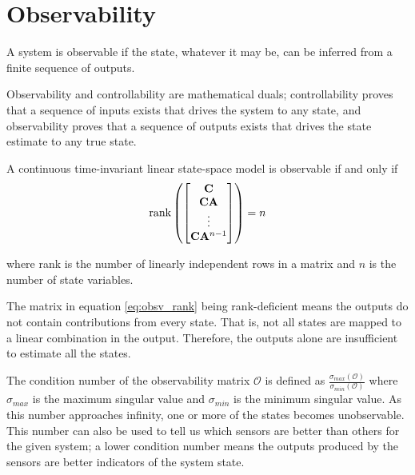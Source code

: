 \section{Observability}

A \gls{system} is observable if the \gls{state}, whatever it may be, can be
inferred from a finite sequence of \glspl{output}.

Observability and controllability are mathematical duals; controllability proves
that a sequence of \glspl{input} exists that drives the \gls{system} to any
\gls{state}, and observability proves that a sequence of \glspl{output} exists
that drives the \gls{state} estimate to any true \gls{state}.
\begin{theorem}[Observability]
  A continuous \gls{time-invariant} linear state-space \gls{model} is observable
  if and only if
  \begin{equation}
    \operatorname{rank}\left(
    \begin{bmatrix}
      \mathbf{C} \\
      \mathbf{C}\mathbf{A} \\
      \vdots \\
      \mathbf{C}\mathbf{A}^{n-1}
    \end{bmatrix}\right) = n \label{eq:obsv_rank}
  \end{equation}

  where rank is the number of linearly independent rows in a matrix and $n$ is
  the number of \gls{state} variables.
\end{theorem}

The matrix in equation \eqref{eq:obsv_rank} being rank-deficient means the
\glspl{output} do not contain contributions from every \gls{state}. That is, not
all \glspl{state} are mapped to a linear combination in the \gls{output}.
Therefore, the \glspl{output} alone are insufficient to estimate all the
\glspl{state}.

The condition number of the observability matrix $\mathcal{O}$ is defined as
$\frac{\sigma_{max}(\mathcal{O})}{\sigma_{min}(\mathcal{O})}$ where
$\sigma_{max}$ is the maximum singular value and
$\sigma_{min}$ is the minimum singular value. As this number approaches
infinity, one or more of the \glspl{state} becomes unobservable. This number can
also be used to tell us which sensors are better than others for the given
\gls{system}; a lower condition number means the \glspl{output} produced by the
sensors are better indicators of the \gls{system} \gls{state}.
